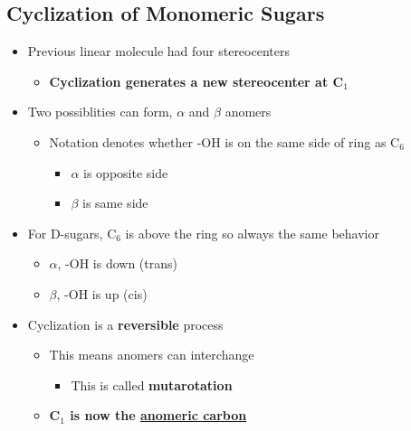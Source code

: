 \documentclass[10pt]{article}
\begin{document}
\subsection*{Cyclization of Monomeric Sugars}
\begin{itemize}
    \item Previous linear molecule had four stereocenters
    \begin{itemize}
        \item \textbf{Cyclization generates a new stereocenter at C$_1$}
    \end{itemize}
    \item Two possiblities can form, $\alpha$ and $\beta$ anomers
    \begin{itemize}
        \item Notation denotes whether -OH is on the same side of ring as C$_6$
        \begin{itemize}
            \item $\alpha$ is opposite side
            \item $\beta$ is same side
        \end{itemize}
    \end{itemize}
    \item For D-sugars, C$_6$ is above the ring so always the same behavior
    \begin{itemize}
        \item $\alpha$, -OH is down (trans)
        \item $\beta$, -OH is up (cis)
    \end{itemize}
    \item Cyclization is a \textbf{reversible} process
    \begin{itemize}
        \item This means anomers can interchange
        \begin{itemize}
            \item This is called \textbf{mutarotation}
        \end{itemize}
        \item \textbf{C$_1$ is now the \underline{anomeric carbon}}
    \end{itemize}
\end{itemize}
\end{document}

